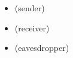 \documentclass{beamer}
\title{\deliv{\pp}{Presentation}}
\begin{document}
\maketitle


\begin{frame}
\begin{itemize}
\item
  \alice{} (sender) \encryptex
\item
  \bob{} (receiver) \decryptex
\item
  \eve{} (eavesdropper) \eavesdropex
\end{itemize}
\end{frame}

\end{document}
